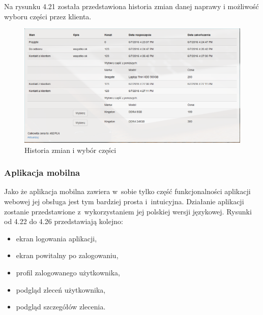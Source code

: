 \documentclass[a4paper,11pt]{article}
\begin{document}
Na rysunku 4.21 została przedstawiona historia zmian danej naprawy i możliwość wyboru części przez klienta.
\begin{figure}[H]
	\centering
	\includegraphics[width=\textwidth,height=0.5\textheight]{historia.png}
	\caption{Historia zmian i wybór części}
\end{figure}
\subsubsection{Aplikacja mobilna}
Jako że aplikacja mobilna zawiera w~sobie tylko część funkcjonalności aplikacji webowej jej obsługa jest tym bardziej prosta i~intuicyjna. Działanie aplikacji zostanie przedstawione z~wykorzystaniem jej polskiej wersji językowej. Rysunki od 4.22 do 4.26 przedstawiają kolejno:
\begin{itemize}
	\item ekran logowania aplikacji,
	\item ekran powitalny po zalogowaniu,
	\item profil zalogowanego użytkownika,
	\item podgląd zleceń użytkownika,
	\item podgląd szczegółów zlecenia.
\end{itemize}
\end{document}
